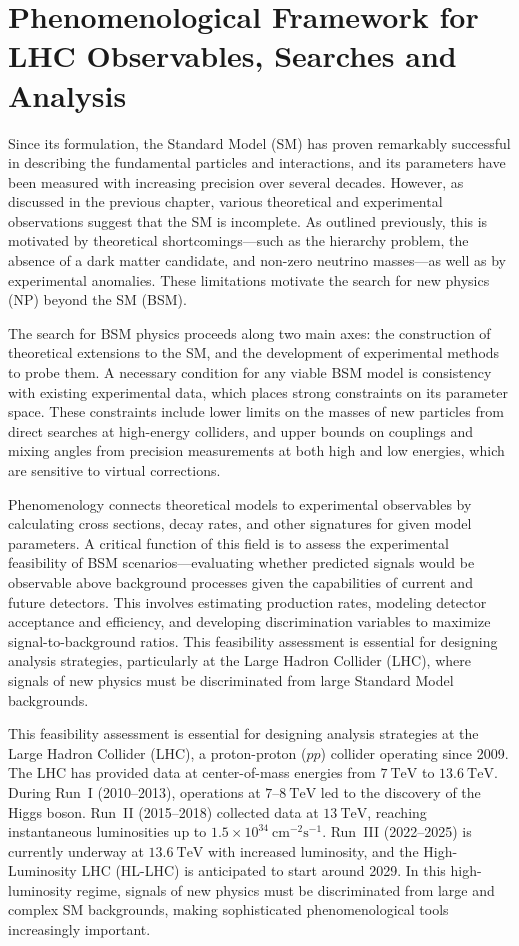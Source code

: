 \chapter{Phenomenological Framework for LHC Observables, Searches and Analysis}

Since its formulation, the Standard Model (SM) has proven remarkably successful in describing the fundamental particles and interactions, and its parameters have been measured with increasing precision over several decades. However, as discussed in the previous chapter, various theoretical and experimental observations suggest that the SM is incomplete. As outlined previously, this is motivated by theoretical shortcomings—such as the hierarchy problem, the absence of a dark matter candidate, and non-zero neutrino masses—as well as by experimental anomalies. These limitations motivate the search for new physics (NP) beyond the SM (BSM).

The search for BSM physics proceeds along two main axes: the construction of theoretical extensions to the SM, and the development of experimental methods to probe them. A necessary condition for any viable BSM model is consistency with existing experimental data, which places strong constraints on its parameter space. These constraints include lower limits on the masses of new particles from direct searches at high-energy colliders, and upper bounds on couplings and mixing angles from precision measurements at both high and low energies, which are sensitive to virtual corrections.

Phenomenology connects theoretical models to experimental observables by calculating cross sections, decay rates, and other signatures for given model parameters. A critical function of this field is to assess the experimental feasibility of BSM scenarios—evaluating whether predicted signals would be observable above background processes given the capabilities of current and future detectors. This involves estimating production rates, modeling detector acceptance and efficiency, and developing discrimination variables to maximize signal-to-background ratios. This feasibility assessment is essential for designing analysis strategies, particularly at the Large Hadron Collider (LHC), where signals of new physics must be discriminated from large Standard Model backgrounds.

This feasibility assessment is essential for designing analysis strategies at the Large Hadron Collider (LHC), a proton-proton ($pp$) collider operating since 2009. The LHC has provided data at center-of-mass energies from $7~\mathrm{TeV}$ to $13.6~\mathrm{TeV}$. During Run~I (2010–2013), operations at $7$–$8~\mathrm{TeV}$ led to the discovery of the Higgs boson. Run~II (2015–2018) collected data at $13~\mathrm{TeV}$, reaching instantaneous luminosities up to $1.5 \times 10^{34}~\mathrm{cm}^{-2}\mathrm{s}^{-1}$. Run~III (2022–2025) is currently underway at $13.6~\mathrm{TeV}$ with increased luminosity, and the High-Luminosity LHC (HL-LHC) is anticipated to start around 2029. In this high-luminosity regime, signals of new physics must be discriminated from large and complex SM backgrounds, making sophisticated phenomenological tools increasingly important.

 
 
 
 
